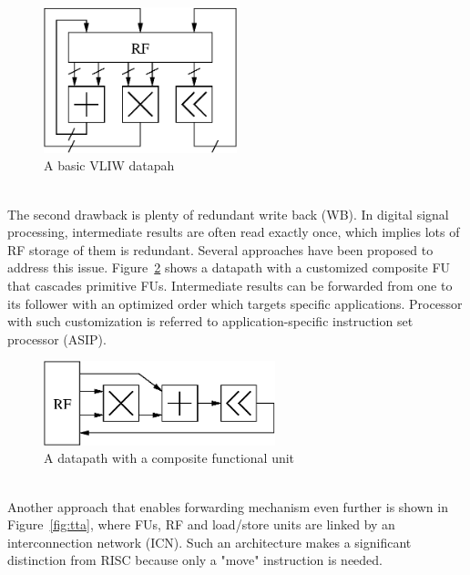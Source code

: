         \vspace{\textfig}
        \begin{figure}[!ht] 
            \centering
            \includegraphics[width=0.5\textwidth]{./figs/vliw.eps}
            \caption{A basic VLIW datapah}
            \label{fig:vliw}
        \end{figure}
        \\\indent
        The second drawback is plenty of redundant write back (WB). 
        In digital signal processing, intermediate results are often read exactly once, which implies lots of RF storage of them is redundant.
        Several approaches have been proposed to address this issue.
        Figure~\ref{fig:cascade} shows a datapath with a customized composite FU that cascades primitive FUs. 
        Intermediate results can be forwarded from one to its follower with an optimized order which targets specific applications.
        Processor with such customization is referred to application-specific instruction set processor (ASIP).
        \vspace{\textfig}
        \begin{figure}[!ht] 
            \centering
            \includegraphics[width=0.6\textwidth]{./figs/cascade.eps}
            \caption{A datapath with a composite functional unit}
            \label{fig:cascade}
        \end{figure}
        \\\indent
        Another approach that enables forwarding mechanism even further is shown in Figure~\ref{fig:tta}, where FUs, RF and load/store units are linked by an interconnection network (ICN).
        Such an architecture makes a significant distinction from RISC because only a "move" instruction is needed. 
